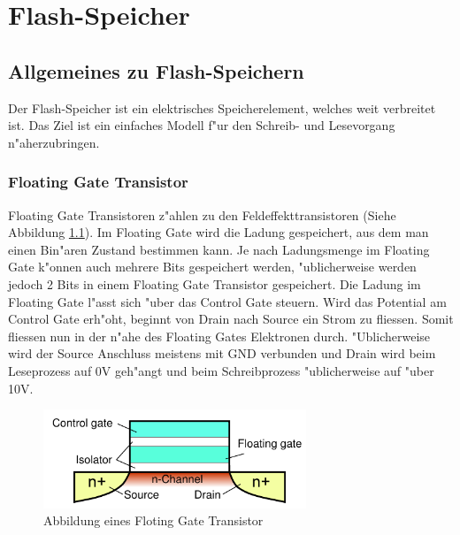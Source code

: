 \chapter{Flash-Speicher\label{chapter:flash}}
\begin{refsection}

\section{Allgemeines zu Flash-Speichern}
Der Flash-Speicher ist ein elektrisches Speicherelement, welches
weit verbreitet ist.
Das Ziel ist ein einfaches Modell f"ur den Schreib- und Lesevorgang
n"aherzubringen.

\subsection{Floating Gate Transistor}
Floating Gate Transistoren z"ahlen zu den Feldeffekttransistoren
(Siehe Abbildung \ref{skript:Floatinggatetransistor}).
Im Floating Gate wird die Ladung gespeichert, aus dem man einen Bin"aren
Zustand bestimmen kann.
Je nach Ladungsmenge im Floating Gate k"onnen auch mehrere Bits gespeichert
werden, "ublicherweise werden jedoch 2 Bits in einem Floating Gate
Transistor gespeichert.
Die Ladung im Floating Gate l"asst sich "uber das Control Gate steuern.
Wird das Potential am Control Gate erh"oht, beginnt von Drain nach
Source ein Strom zu fliessen.
Somit fliessen nun in der n"ahe des Floating Gates Elektronen durch.
"Ublicherweise wird der Source Anschluss meistens mit GND verbunden und
Drain wird beim Leseprozess auf 0V geh"angt und beim Schreibprozess
"ublicherweise auf "uber 10V.

\begin{figure}
\centering
\includegraphics[width=0.7\textwidth]{flash/graphics/Floatinggate.pdf}
\caption{Abbildung eines Floting Gate Transistor \cite{flash:floatinggate}}
\label{skript:Floatinggatetransistor}
\end{figure}


\end{refsection}
